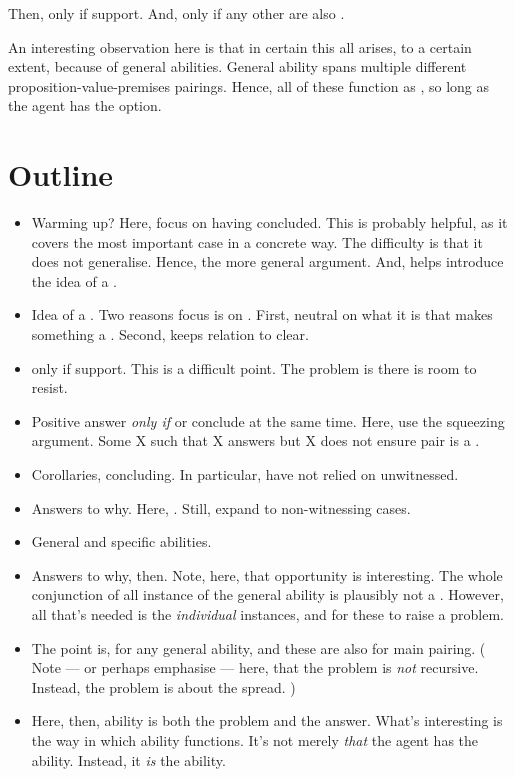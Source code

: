 \begin{note}
  Then, \fc{} only if support.
  And, \fc{} only if any other \requ{} are also \fc{}.
\end{note}

\begin{note}
  An interesting observation here is that in certain this all arises, to a certain extent, because of general abilities.
  General ability spans multiple different proposition-value-premises pairings.
  Hence, all of these function as , so long as the agent has the option.
\end{note}


\section{Outline}

\begin{note}
  \begin{itemize}
  \item
    Warming up?
    Here, focus on having concluded.
    This is probably helpful, as it covers the most important case in a concrete way.
    The difficulty is that it does not generalise.
    Hence, the more general argument.
    And, helps introduce the idea of a \fc{}.
  \item
    Idea of a \fc{}.
    Two reasons focus is on \fc{}.
    First, neutral on what it is that makes something a \fc{}.
    Second, keeps relation to \qzS{} clear.
  \item
    \fc{} only if support.
    This is a difficult point.
    The problem is there is room to resist.
  \item
    Positive answer \emph{only if} \fc{} or conclude at the same time.
    Here, use the squeezing argument.
    Some X such that X answers but X does not ensure pair is a \fc{}.
  \item
    Corollaries, concluding.
    In particular, have not relied on unwitnessed.
  \item
    Answers to why.
    Here, .
    Still, expand to non-witnessing cases.
  \item
    General and specific abilities.
  \item
    Answers to why, then.
    Note, here, that opportunity is interesting.
    The whole conjunction of all instance of the general ability is plausibly not a \requ{}.
    However, all that's needed is the \emph{individual} instances, and for these to raise a problem.
  \item
    The point is,  for any general ability, and these are also  for main pairing.
    (%
    Note --- or perhaps emphasise --- here, that the problem is \emph{not} recursive.
    Instead, the problem is about the spread.%
    )
  \item
    Here, then, ability is both the problem and the answer.
    What's interesting is the way in which ability functions.
    It's not merely \emph{that} the agent has the ability.
    Instead, it \emph{is} the ability.
  \end{itemize}
\end{note}

